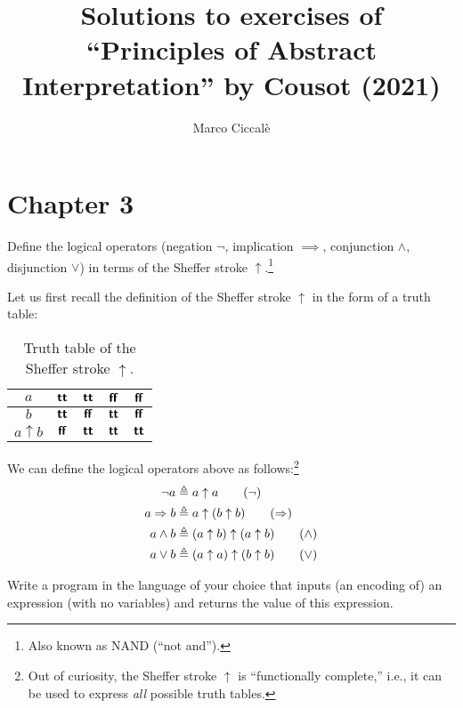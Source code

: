 \documentclass[10pt,justified,nofonts]{tufte-handout}
\title{Solutions to exercises of ``Principles of Abstract Interpretation'' by Cousot (2021)}
\author{Marco Ciccal{\`{e}}}
\begin{document}
%
\maketitle
%
\tableofcontents
%
\section{Chapter 3}
%
\begin{exercise}{3.6}
  Define the logical operators (negation $\neg$, implication
  $\implies$, conjunction $\wedge$, disjunction $\vee$) in terms of
  the Sheffer stroke $\uparrow$.\footnote{Also known as NAND (``not and'').}
\end{exercise}
%
\begin{answer}
  Let us first recall the definition of the Sheffer stroke $\uparrow$
  in the form of a truth table:
  
  \begin{table}
    \centering
    \caption{Truth table of the Sheffer stroke $\uparrow$.}
    \begin{tabular}{c|c|c|c|c}
      $a$ & $\textbf{\textsf{tt}}$ & $\textbf{\textsf{tt}}$ & $\textbf{\textsf{ff}}$ & $\textbf{\textsf{ff}}$\\\hline
      $b$ & $\textbf{\textsf{tt}}$ & $\textbf{\textsf{ff}}$ & $\textbf{\textsf{tt}}$ & $\textbf{\textsf{ff}}$\\\hline
      $a \uparrow b$ & $\textbf{\textsf{ff}}$ & $\textbf{\textsf{tt}}$ & $\textbf{\textsf{tt}}$ & $\textbf{\textsf{tt}}$
    \end{tabular}
  \end{table}
  
  \noindent We can define the logical operators above as
  follows:\footnote{Out of curiosity, the Sheffer stroke $\uparrow$ is
    ``functionally complete,'' i.e., it can be used to express
    \emph{all} possible truth tables.}
  \begin{align*}
          \neg a &\isDefAs a \uparrow a\tag{$\neg$}\\
    a \implies b &\isDefAs a \uparrow (b \uparrow b)\tag{$\implies$}\\
    a   \wedge b &\isDefAs (a \uparrow b) \uparrow (a \uparrow b)\tag{$\wedge$}\\
    a     \vee b &\isDefAs (a \uparrow a) \uparrow (b \uparrow b)\tag{$\vee$}
  \end{align*}
\end{answer}
%
\begin{exercise}{3.7}
  Write a program in the language of your choice that inputs (an
  encoding of) an expression (with no variables) and returns the value
  of this expression.
\end{exercise}
\end{document}
